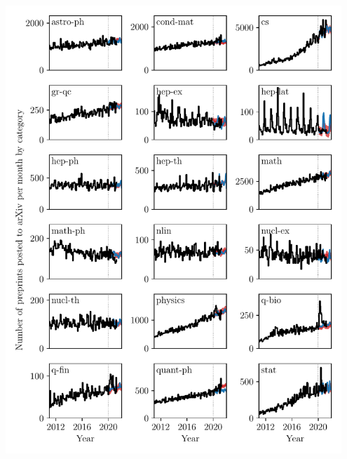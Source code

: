 \documentclass{nature}
\makeatletter
\renewenvironment*{figure}{\@float{figure}}{\end@float}
\newcommand{\todo}[1]{\textcolor{gray}{#1}}
\newcommand{\arxiv}{arXiv}
\makeatother
\begin{document}
 \begin{figure}
 	\centering
     \includegraphics[width=0.95\textwidth]{pre-prints-segmented-by-field}
     \caption{Most fields saw no change in the number of pre-prints posted due to the COVID-19 pandemic. \todo{The model.} The exception is quantitative biology (q-bio), where the spike in 2020 is in part caused by COVID-19 related pre-prints authored by people who are non-established biologists.}
     \label{fig:pre-prints-segmented-by-field}
 \end{figure}
 
\end{document}
